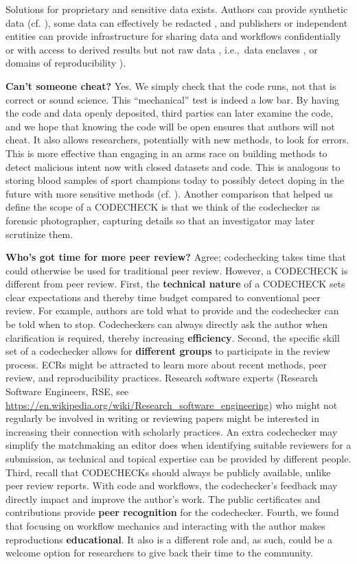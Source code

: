 \documentclass[12pt]{article}
\begin{document}
Solutions for proprietary and sensitive data exists.  Authors can
provide synthetic data (cf. \cite{shannon_opening_2018}), some data
can effectively be redacted \cite{oloughlin_data_2015}, and publishers
or independent entities can provide infrastructure for sharing data
and workflows confidentially \cite{perignon_certify_2019} or with
access to derived results but not raw data
\cite{shannon_opening_2018}, i.e.,~data enclaves
\cite{foster_research_2018}, or domains of reproducibility
\cite{harris_more_2017}).

\textbf{Can't someone cheat?} Yes. We simply check that the code runs,
not that is correct or sound science. This ``mechanical'' test is
indeed a low bar.  By having the code and data openly deposited, third
parties can later examine the code, and we hope that knowing the code
will be open ensures that authors will not cheat.  It also allows
researchers, potentially with new methods, to look for errors.  This
is more effective than engaging in an arms race on building methods to
detect malicious intent now with closed datasets and code.  This is
analogous to storing blood samples of sport champions today to
possibly detect doping in the future with more sensitive methods
(cf. \cite{everythinghertz97}).  Another comparison that helped us
define the scope of a CODECHECK is that we think of the codechecker as
forensic photographer, capturing details so that an investigator may
later scrutinize them.

\textbf{Who's got time for more peer review?} Agree; codechecking
takes time that could otherwise be used for traditional peer review.
However, a CODECHECK is different from peer review.  First, the
\textbf{technical nature} of a CODECHECK sets clear expectations and
thereby time budget compared to conventional peer review.  For
example, authors are told what to provide and the codechecker can be
told when to stop.  Codecheckers can always directly ask the author
when clarification is required, thereby increasing
\textbf{efficiency}.  Second, the specific skill set of a codechecker
allows for \textbf{different groups} to participate in the review
process.  ECRs might be attracted to learn more about recent methods,
peer review, and reproducibility practices.  Research software experts
(Research Software Engineers,
RSE, see \url{https://en.wikipedia.org/wiki/Research_software_engineering})
who might not regularly be involved in writing or reviewing papers
might be interested in increasing their connection with scholarly
practices.  An extra codechecker may simplify the matchmaking an
editor does when identifying suitable reviewers for a submission,
as technical and topical expertise can be provided by different
people.  Third, recall that CODECHECKs should always be publicly
available, unlike peer review reports.  With code and workflows, the
codechecker's feedback may directly impact and improve the author's
work.  The public certificates and contributions provide \textbf{peer
  recognition} for the codechecker.  Fourth, we found that focusing on
workflow mechanics and interacting with the author makes reproductions
\textbf{educational}. It also is a different role and, as such, could
be a welcome option for researchers to give back their time to the
community.
\end{document}

